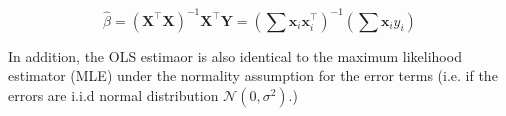 $$\hat{\beta} = (\mathbf{X}^\top \mathbf{X})^{-1} \mathbf{X}^\top \mathbf{Y} = (\sum{\mathbf{x}_i\mathbf{x}_i^\top})^{-1} (\sum{\mathbf{x}_i} y_i) $$ 

In addition, the OLS estimaor is also identical to the maximum likelihood estimator (MLE) under the normality assumption for the error terms \cite{test} (i.e. if the errors are i.i.d normal distribution $\mathcal{N}(0, \sigma^2)$.) 






